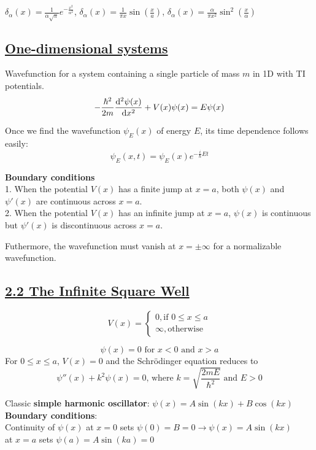     $\delta_{\alpha}(x) = \frac{1}{\alpha \sqrt{\pi}} e^{-\frac{x^2}{\alpha^2}}$,
    $\delta_{\alpha}(x) = \frac{1}{\pi x} \sin(\frac{x}{a})$, 
    $\delta_{\alpha}(x) = \frac{\alpha}{\pi x^2} \sin^2 (\frac{x}{\alpha})$ \\

\subsection{\underline{One-dimensional systems}}
Wavefunction for a system containing a single particle of mass $m$ in 1D with TI potentials.
    $$- \frac{\hbar^2}{2m} \dv[2]{\psi(x)}{x} + V(x) \psi(x) = E \psi(x)$$

Once we find the wavefunction $\psi_E(x)$ of energy $E$, its time dependence follows easily:
    $$\psi_E(x, t) = \psi_E(x) e^{-\frac{i}{\hbar} E t}$$

\textbf{Boundary conditions} \\
1. When the potential $V(x)$ has a finite jump at $x = a$, both $\psi(x)$ and $\psi'(x)$ are continuous across $x = a$. \\
2. When the potential $V(x)$ has an infinite jump at $x = a$, $\psi(x)$ is continuous but $\psi'(x)$ is discontinuous across $x = a$.

Futhermore, the wavefunction must vanish at $x = \pm \infty$ for a normalizable wavefunction.

\subsection{\underline{2.2 The Infinite Square Well}}
    $$V(x) = \begin{cases} 0, \textrm{if } 0 \leq x \leq a \\ \infty, \textrm{otherwise} \end{cases}$$

    $$\psi(x) = 0 \textrm{ for } x < 0 \textrm{ and } x > a$$
For $0 \leq x \leq a$, $V(x) = 0$ and the Schr\"odinger equation reduces to 
    $$\psi''(x) + k^2 \psi(x) = 0 \textrm{, where } k = \sqrt{\frac{2mE}{\hbar^2}} \textrm{ and } E > 0$$

Classic \textbf{simple harmonic oscillator}: $\psi(x) = A \sin(kx) + B \cos(kx)$ \\

\textbf{Boundary conditions}: \\
Continuity of $\psi(x)$ at $x = 0$ sets $\psi(0) = B = 0 \rightarrow \psi(x) = A \sin(kx)$ \\
at $x = a$ sets $\psi(a) = A \sin(ka) = 0$

